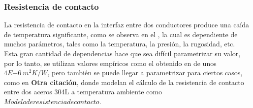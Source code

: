 \subsubsection{Resistencia de contacto}
La resistencia de contacto en la interfaz entre dos conductores produce una caída de temperatura significante, como se observa en el \cite{noauthor_parallel-plate_nodate}, la cual es dependiente de muchos parámetros, tales como la temperatura, la presión, la rugosidad, etc.\\

Esta gran cantidad de dependencias hace que sea difícil parametrizar su valor, por lo tanto, se utilizan valores empíricos como el obtenido en \cite{noauthor_parallel-plate_nodate} de unos $4E{-6} \ m^2K/W$, pero también se puede llegar a parametrizar para ciertos casos, como en \textbf{Otra citación}, donde modelan el cálculo de la resistencia de contacto entre dos aceros 304L a temperatura ambiente como $Modelo de resistencia de contacto$.



